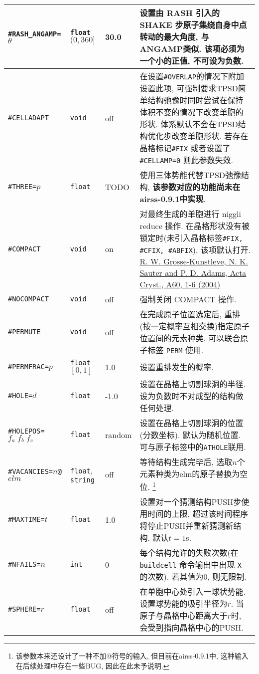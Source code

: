 \documentclass[a4paper, 10pt]{article}
\begin{document}
\begin{center}
\begin{longtable}{m{11em}|m{4em}<{\centering}|m{3em}<{\centering}|m{15em}}
\midrule
\verb|#RASH_ANGAMP=|\(\theta\) & \verb|float| \((0,360]\) & 30.0 & 设置由 RASH 引入的 SHAKE 步原子集绕自身中点转动的最大角度, 与ANGAMP类似. 该项必须为一个小的正值, \textbf{不可设为负数}.\\
\midrule
\verb|#CELLADAPT|& \verb|void| & off & 在设置\verb|#OVERLAP|的情况下附加设置此项, 可强制要求TPSD简单结构弛豫时同时尝试在保持体积不变的情况下改变单胞的形状. 体系默认不会在TPSD结构优化步改变单胞形状. 若存在晶格标记\verb|#FIX| 或者设置了 \verb|#CELLAMP=0| 则此参数失效. \\
\midrule
\verb|#THREE=|\(p\)& \verb|float| & TODO & 使用三体势能代替TPSD弛豫结构, \textbf{该参数对应的功能尚未在airss-0.9.1中实现}.\\
\midrule
\verb|#COMPACT|& \verb|void| & on & 对最终生成的单胞进行 niggli reduce 操作. 在晶格形状没有被锁定时(未引入晶格标签\verb|#FIX, #CFIX, #ABFIX|), 该项默认打开. \href{http://atztogo.github.io/niggli/#algorithm}{R. W. Grosse-Kunstleve, N. K. Sauter and P. D. Adams, Acta Cryst., A60, 1-6 (2004)} \\
\midrule
\verb|#NOCOMPACT| & \verb|void| & off & 强制关闭 COMPACT 操作.\\
\midrule
\verb|#PERMUTE| & \verb|void| & off & 在完成原子位置选定后, 重排(按一定概率互相交换)指定原子位置间的元素种类. 可以联合原子标签 \verb|PERM| 使用.\\
\midrule
\verb|#PERMFRAC=|\(p\) & \verb|float| \([0,1]\)  & 1.0 & 设置重排发生的概率.\\
\midrule
\verb|#HOLE=|\(d\) & \verb|float| & -1.0 & 设置在晶格上切割球洞的半径. 设为负数时不对成型的结构做任何处理.\\
\midrule
\verb|#HOLEPOS=|\(f_a\;f_b\;f_c\) & \verb|float| & random & 设置在晶格上切割球洞的位置(分数坐标). 默认为随机位置. 可与原子标签中的\verb|ATHOLE|联用.\\
\midrule
\verb|#VACANCIES=|\(n\)\verb|@|\(elm\)& \verb|float|, \verb|string| & off & 等待结构生成完毕后, 选取\(n\)个元素种类为elm的原子替换为空位. \footnote{该参数本来还设计了一种不加@符号的输入, 但目前在airss-0.9.1中, 这种输入在后续处理中存在一些BUG, 因此在此未予说明.}\\
\midrule
\verb|#MAXTIME=|\(t\)& \verb|float| & 1.0 & 设置对一个猜测结构PUSH步使用时间的上限, 超过该时间程序将停止PUSH并重新猜测新结构. 默认\(t=1\)s.\\
\midrule
\verb|#NFAILS=|\(n\)& \verb|int| & 0 & 每个结构允许的失败次数(在 \verb|buildcell| 命令输出中出现 \verb|X| 的次数). 若其值为0, 则无限制.\\
\midrule
\verb|#SPHERE=|\(r\) & \verb|float| & off & 在单胞中心处引入一球状势能. 设置球势能的吸引半径为\(r\). 当原子与晶格中心距离大于\(r\)时, 会受到指向晶格中心的PUSH.\\

\end{longtable}
\end{center}
\end{document}
